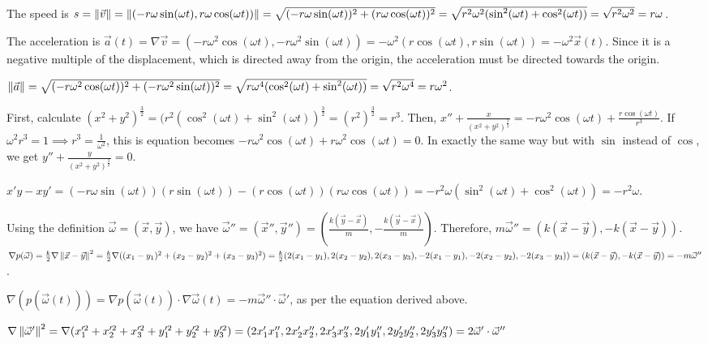 The speed is $s = \left\lVert\vec{v}\right\rVert = \left\lVert(-r \omega \sin(\omega t), r \omega \cos(\omega t))\right\rVert = \sqrt{(-r \omega \sin(\omega t))^2 + (r \omega \cos(\omega t))^2} = \sqrt{r^2 \omega^2(\sin^2(\omega t) + \cos^2(\omega t))} = \sqrt{r^2\omega^2} = r\omega$.

The acceleration is $\vec{a}(t) = \nabla \vec{v} = (-r \omega^2 \cos(\omega t), -r \omega^2 \sin(\omega t)) = -\omega^2(r \cos(\omega t), r \sin(\omega t)) = -\omega^2 \vec{x}(t)$. Since it is a negative multiple of the displacement, which is directed away from the origin, the acceleration must be directed towards the origin.

$\left\lVert\vec{a}\right\rVert = \sqrt{(-r \omega^2 \cos(\omega t))^2 + (-r \omega^2 \sin(\omega t))^2} = \sqrt{r\omega^4(\cos^2(\omega t) + \sin^2(\omega t))} = \sqrt{r^2\omega^4} = r\omega^2$.

First, calculate $(x^2 + y^2)^{\frac{3}{2}} = (r^2(\cos^2(\omega t) + \sin^2(\omega t))^\frac{3}{2} = (r^2)^\frac{3}{2} = r^3$. Then, $x'' + \frac{x}{(x^2 + y^2)^{\frac{3}{2}}} = -r \omega^2 \cos(\omega t) + \frac{r\cos(\omega t)}{r^3}$. If $\omega^2r^3 = 1 \implies r^3 = \frac{1}{\omega^2}$, this is equation becomes $-r \omega^2 \cos(\omega t) + r \omega^2 \cos(\omega t) = 0$. In exactly the same way but with $\sin$ instead of $\cos$, we get $y'' + \frac{y}{(x^2 + y^2)^{\frac{3}{2}}} = 0$.

$x'y - xy' = (-r \omega \sin(\omega t))(r \sin(\omega t)) - (r \cos(\omega t))(r \omega \cos(\omega t)) = -r^2 \omega(\sin^2(\omega t) + \cos^2(\omega t)) = -r^2 \omega$.


Using the definition $\vec{\omega} = (\vec{x}, \vec{y})$, we have $\vec{\omega}'' = (\vec{x}'', \vec{y}'') = \left(\frac{k(\vec{y} - \vec{x})}{m}, -\frac{k(\vec{y} - \vec{x})}{m}\right)$. Therefore, $m\vec{\omega}'' = (k(\vec{x} - \vec{y}), -k(\vec{x} - \vec{y}))$. $\nabla p(\vec{\omega}) = \frac{k}{2} \nabla \left\lVert\vec{x} - \vec{y}\right\rVert^2 = \frac{k}{2} \nabla ((x_1 - y_1)^2 + (x_2 - y_2)^2 + (x_3 - y_3)^2) = \frac{k}{2} (2(x_1 - y_1), 2(x_2 - y_2), 2(x_3 - y_3), -2(x_1 - y_1), -2(x_2 - y_2), -2(x_3 - y_3)) = (k(\vec{x} - \vec{y}), -k(\vec{x} - \vec{y})) = -m\vec{\omega}''$.

$\nabla (p(\vec{\omega}(t))) = \nabla p(\vec{\omega}(t)) \cdot \nabla \vec{\omega}(t) = -m\vec{\omega}'' \cdot \vec{\omega}'$, as per the equation derived above.

$\nabla \left\lVert\vec{\omega}'\right\rVert^2 = \nabla (x_1'^2 + x_2'^2 + x_3'^2 + y_1'^2 + y_2'^2 + y_3'^2) = (2x_1'x_1'', 2x_2'x_2'', 2x_3'x_3'', 2y_1'y_1'', 2y_2'y_2'', 2y_3'y_3'') = 2 \vec{\omega}' \cdot \vec{\omega}''$

